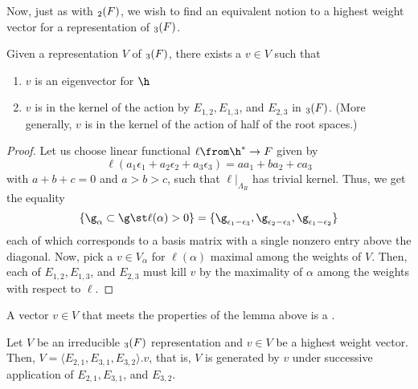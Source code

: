\documentclass[11pt,leqno,oneside]{amsart}
\numberwithin{thm}{section}
\newcommand{\rootlattice}{\Lambda_R}
\begin{document}
Now, just as with \(\sl_2(F)\), we wish to find an equivalent notion
to a highest weight
vector for a representation of \(\sl_3(F)\).
\begin{lem}\label{hwtvec-exists}
  Given a representation \(V\) of \(\sl_3(F)\), there exists a \(v \in
  V\) such that
  \begin{enumerate}
  \item \(v\) is an eigenvector for \(\h\)
  \item \(v\) is in the kernel of the action by \(E_{1,2}, E_{1,3}\),
    and \(E_{2,3}\) in \(\sl_3(F)\). (More generally, \(v\) is in the
    kernel of the action of half of the root spaces.)
  \end{enumerate}
\end{lem}
\begin{proof}
  Let us choose linear functional \(\ell \from \h^* \to F\)
  given by \[
    \ell(a_1 \epsilon_1 + a_2 \epsilon_2 + a_3 \epsilon_3) = aa_1 + b
    a_2 + c a_3
  \]
  with \(a+b+c=0\) and \(a>b>c\), such that \(\ell|_{\rootlattice}\) has
  trivial kernel. Thus, we get the equality \[
    \{\g_\alpha \subset \g \st \ell(\alpha) > 0\} =
    \{\g_{\epsilon_1-\epsilon_3}, \g_{\epsilon_2-\epsilon_3},
    \g_{\epsilon_1-\epsilon_2} \}
  \]
  each of which corresponds to a basis matrix with a single nonzero
  entry above the diagonal. Now, pick a \(v \in V_\alpha\) for
  \(\ell(\alpha)\) maximal among the weights of \(V\). Then, each of
  \(E_{1,2}, E_{1,3}\), and \(E_{2,3}\) must kill \(v\) by the
  maximality of \(\alpha\) among the weights with respect to \(\ell\).
\end{proof}
\begin{defn}
  A vector \(v \in V\) that meets the properties of the lemma above is
  a .
\end{defn}
\begin{prop}
  Let \(V\) be an irreducible \(\sl_3(F)\) representation and \(v \in
  V\) be a highest weight vector. Then, \(V = \langle E_{2,1},
  E_{3,1}, E_{3,2}\rangle.v\), that is, \(V\) is generated by \(v\)
  under successive application of \(E_{2,1}, E_{3,1}\), and \(E_{3,2}\).
\end{prop}
\end{document}

